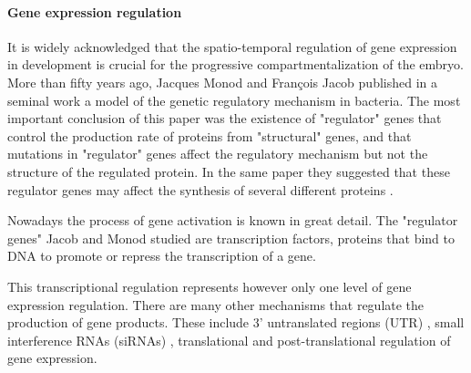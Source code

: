 %




\paragraph{Gene expression regulation}

It is widely acknowledged that the spatio-temporal regulation of gene expression in development is crucial for the progressive compartmentalization of the embryo. 
More than fifty years ago, Jacques Monod and Fran\c cois Jacob \citep{Jacob1961} published in a seminal work a model of the genetic regulatory mechanism in bacteria.
The most important conclusion of this paper was the existence of "regulator" genes that control the production rate of proteins from "structural" genes, and that mutations in "regulator" genes affect the regulatory mechanism but not the structure of the regulated protein. In the same paper they suggested that these regulator genes may affect the synthesis of several different proteins \citep{Jacob1961}.

Nowadays the process of gene activation is known in great detail. The  "regulator genes" Jacob and Monod studied are transcription factors, proteins that bind to DNA to promote or repress the transcription of a gene.

This transcriptional regulation represents however only one level of gene expression regulation. There are many other mechanisms that regulate the production of gene products. These include 3' untranslated regions (UTR) \citep{Grzybowska2001}, small interference RNAs (siRNAs) \citep{Filipowicz2005}, translational \citep{Kozak1992,Kapp2004} and post-translational \citep{Mann2003} regulation of gene expression.

